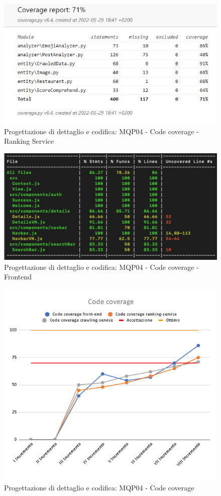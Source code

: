 \begin{figure}[H]
\centering
    \includegraphics[scale=0.70]{Sezioni/images/pb_prodotto/coverage-RS.JPG}
    \caption{Progettazione di dettaglio e codifica: MQP04 - Code coverage - Ranking Service}
\end{figure}
\begin{figure}[H]
    \centering
        \includegraphics[scale=0.50]{Sezioni/images/pb_prodotto/cov frontend.PNG}
        \caption{Progettazione di dettaglio e codifica: MQP04 - Code coverage - Frontend}
    \end{figure}
\begin{figure}[H]
    \centering
    \includegraphics[scale=0.50]{Sezioni/images/pb_prodotto/Code_coverage.png}
    \caption{Progettazione di dettaglio e codifica: MQP04 - Code coverage}
\end{figure}
